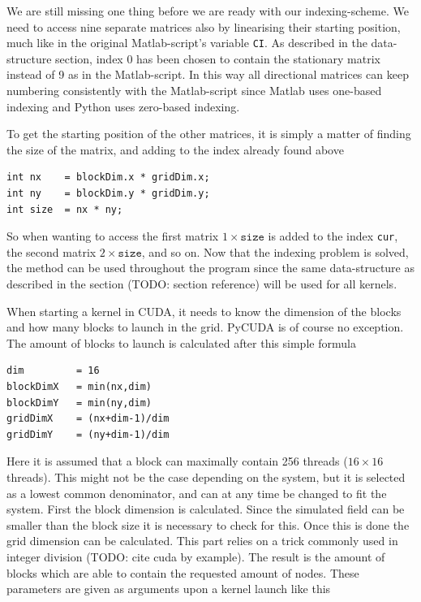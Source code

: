 We are still missing one thing before we are ready with our indexing-scheme. We need to access nine separate matrices also by linearising their starting position, much like in the original Matlab-script's variable \texttt{CI}. As described in the data-structure section, index 0 has been chosen to contain the stationary matrix instead of 9 as in the Matlab-script. In this way all directional matrices can keep numbering consistently with the Matlab-script since Matlab uses one-based indexing and Python uses zero-based indexing.

To get the starting position of the other matrices, it is simply a matter of finding the size of the matrix, and adding to the index already found above

\begin{verbatim}
int nx    = blockDim.x * gridDim.x;
int ny    = blockDim.y * gridDim.y;
int size  = nx * ny;
\end{verbatim}

So when wanting to access the first matrix $1 \times \mathrm{\texttt{size}}$ is added to the index \texttt{cur}, the second matrix $2 \times \mathrm{\texttt{size}}$, and so on. Now that the indexing problem is solved, the method can be used throughout the program since the same data-structure as described in the section (TODO: section reference) will be used for all kernels.

When starting a kernel in CUDA, it needs to know the dimension of the blocks and how many blocks to launch in the grid. PyCUDA is of course no exception. The amount of blocks to launch is calculated after this simple formula

\begin{verbatim}
dim         = 16
blockDimX   = min(nx,dim)
blockDimY   = min(ny,dim)
gridDimX    = (nx+dim-1)/dim
gridDimY    = (ny+dim-1)/dim
\end{verbatim}

Here it is assumed that a block can maximally contain 256 threads ($16\times16$ threads). This might not be the case depending on the system, but it is selected as a lowest common denominator, and can at any time be changed to fit the system. First the block dimension is calculated. Since the simulated field can be smaller than the block size it is necessary to check for this. Once this is done the grid dimension can be calculated. This part relies on a trick commonly used in integer division (TODO: cite cuda by example). The result is the amount of blocks which are able to contain the requested amount of nodes. These parameters are given as arguments upon a kernel launch like this

